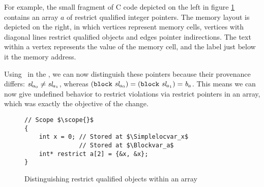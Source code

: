 For example, the small fragment of C code depicted on the left in figure \ref{fig:array-bases} contains an
array $a$ of restrict qualified integer pointers.
The memory layout is depicted on the right, in which vertices represent memory cells,
vertices with diagonal lines restrict qualified objects and edges pointer indirections. 
The text within a vertex represents the value of the memory cell, and the label just below
it the memory address.


Using \Simpleloc \ in the \Base, we can now distinguish these pointers because their provenance differs:
$\textit{sl}_{a_0} \neq \textit{sl}_{a_1}$, whereas $(\mathtt{block} \ \textit{sl}_{a_0}) = (\mathtt{block} \ \textit{sl}_{a_1}) = \textit{b}_a$.
This means we can now give undefined behavior to restrict violations via restrict pointers in an array,
which was exactly the objective of the change.

\begin{figure}[htp]
\centering
\begin{minipage}{.5\textwidth}
\centering  
\begin{verbatim}
// Scope $\scope{}$
{
    int x = 0; // Stored at $\Simplelocvar_x$
               // Stored at $\Blockvar_a$
    int* restrict a[2] = {&x, &x};
}
\end{verbatim}
\end{minipage}%
\begin{minipage}{.5\textwidth}
\centering
{}
\end{minipage}
\caption{Distinguishing restrict qualified objects within an array}
\label{fig:array-bases}
\end{figure}

